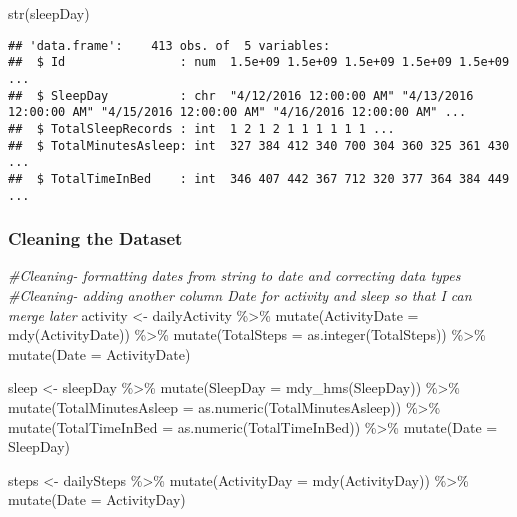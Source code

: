 \documentclass[
]{article}
\newenvironment{Shaded}{\begin{snugshade}}{\end{snugshade}}
\newcommand{\AttributeTok}[1]{\textcolor[rgb]{0.77,0.63,0.00}{#1}}
\newcommand{\CommentTok}[1]{\textcolor[rgb]{0.56,0.35,0.01}{\textit{#1}}}
\newcommand{\FunctionTok}[1]{\textcolor[rgb]{0.00,0.00,0.00}{#1}}
\newcommand{\NormalTok}[1]{#1}
\newcommand{\OtherTok}[1]{\textcolor[rgb]{0.56,0.35,0.01}{#1}}
\newcommand{\SpecialCharTok}[1]{\textcolor[rgb]{0.00,0.00,0.00}{#1}}
\begin{document}
\begin{Shaded}
\begin{Highlighting}[]
\FunctionTok{str}\NormalTok{(sleepDay)}
\end{Highlighting}
\end{Shaded}

\begin{verbatim}
## 'data.frame':    413 obs. of  5 variables:
##  $ Id                : num  1.5e+09 1.5e+09 1.5e+09 1.5e+09 1.5e+09 ...
##  $ SleepDay          : chr  "4/12/2016 12:00:00 AM" "4/13/2016 12:00:00 AM" "4/15/2016 12:00:00 AM" "4/16/2016 12:00:00 AM" ...
##  $ TotalSleepRecords : int  1 2 1 2 1 1 1 1 1 1 ...
##  $ TotalMinutesAsleep: int  327 384 412 340 700 304 360 325 361 430 ...
##  $ TotalTimeInBed    : int  346 407 442 367 712 320 377 364 384 449 ...
\end{verbatim}

\hypertarget{cleaning-the-dataset}{%
\subsubsection{Cleaning the Dataset}\label{cleaning-the-dataset}}

\begin{Shaded}
\begin{Highlighting}[]
\CommentTok{\#Cleaning{-} formatting dates from string to date and correcting data types}
\CommentTok{\#Cleaning{-} adding another column \textquotesingle{}Date\textquotesingle{} for activity and sleep so that I can merge later}
\NormalTok{activity }\OtherTok{\textless{}{-}}\NormalTok{ dailyActivity }\SpecialCharTok{\%\textgreater{}\%} 
  \FunctionTok{mutate}\NormalTok{(}\AttributeTok{ActivityDate =} \FunctionTok{mdy}\NormalTok{(ActivityDate)) }\SpecialCharTok{\%\textgreater{}\%} 
  \FunctionTok{mutate}\NormalTok{(}\AttributeTok{TotalSteps =} \FunctionTok{as.integer}\NormalTok{(TotalSteps)) }\SpecialCharTok{\%\textgreater{}\%} 
  \FunctionTok{mutate}\NormalTok{(}\AttributeTok{Date =}\NormalTok{ ActivityDate)}

\NormalTok{sleep }\OtherTok{\textless{}{-}}\NormalTok{ sleepDay }\SpecialCharTok{\%\textgreater{}\%} 
  \FunctionTok{mutate}\NormalTok{(}\AttributeTok{SleepDay =} \FunctionTok{mdy\_hms}\NormalTok{(SleepDay)) }\SpecialCharTok{\%\textgreater{}\%} 
  \FunctionTok{mutate}\NormalTok{(}\AttributeTok{TotalMinutesAsleep =} \FunctionTok{as.numeric}\NormalTok{(TotalMinutesAsleep)) }\SpecialCharTok{\%\textgreater{}\%} 
  \FunctionTok{mutate}\NormalTok{(}\AttributeTok{TotalTimeInBed =} \FunctionTok{as.numeric}\NormalTok{(TotalTimeInBed)) }\SpecialCharTok{\%\textgreater{}\%} 
  \FunctionTok{mutate}\NormalTok{(}\AttributeTok{Date =}\NormalTok{ SleepDay)}

\NormalTok{steps }\OtherTok{\textless{}{-}}\NormalTok{ dailySteps }\SpecialCharTok{\%\textgreater{}\%} 
  \FunctionTok{mutate}\NormalTok{(}\AttributeTok{ActivityDay =} \FunctionTok{mdy}\NormalTok{(ActivityDay)) }\SpecialCharTok{\%\textgreater{}\%} 
  \FunctionTok{mutate}\NormalTok{(}\AttributeTok{Date =}\NormalTok{ ActivityDay)}
\end{Highlighting}
\end{Shaded}
\end{document}
